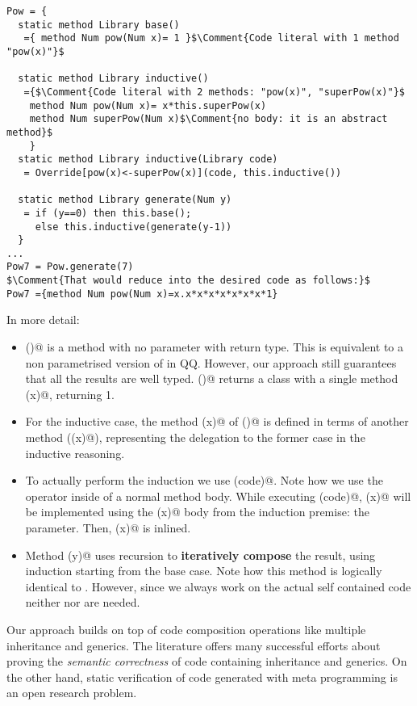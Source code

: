 \begin{lstlisting}
Pow = {
  static method Library base()
   ={ method Num pow(Num x)= 1 }$\Comment{Code literal with 1 method "pow(x)"}$

  static method Library inductive()
   ={$\Comment{Code literal with 2 methods: "pow(x)", "superPow(x)"}$
    method Num pow(Num x)= x*this.superPow(x)
    method Num superPow(Num x)$\Comment{no body: it is an abstract method}$
    }
  static method Library inductive(Library code)
   = Override[pow(x)<-superPow(x)](code, this.inductive())
  
  static method Library generate(Num y)
   = if (y==0) then this.base();
     else this.inductive(generate(y-1))
  }
...
Pow7 = Pow.generate(7)
$\Comment{That would reduce into the desired code as follows:}$
Pow7 ={method Num pow(Num x)=x.x*x*x*x*x*x*x*1}
\end{lstlisting}

\noindent In more detail:
\begin{itemize}
\item
\Q@base()@ is a method with no parameter with \Q@Library@ return type.
This is equivalent to a non parametrised version of \Q@Expr@ in QQ.
However, our approach still guarantees that all the results are well typed.
\Q@base()@ returns a class with a single method \Q@pow(x)@,
returning 1.
\item
For the inductive case, the method \Q@pow(x)@ of \Q@inductive()@ is defined in terms of
another method (\Q@superPow(x)@), representing the delegation to
the former case in the inductive reasoning.
\item To actually perform the induction we use \Q@inductive(code)@.
Note how we use the operator \Q@Override@ inside of a normal method body.
While executing \Q@inductive(code)@,
\Q@superPow(x)@ will be implemented using
the \Q@pow(x)@ body from the induction premise: the \Q@code@ parameter.
Then, \Q@superPow(x)@ is inlined.

\item Method \Q@generate(y)@ uses recursion to \textbf{iteratively compose} the result, using induction starting from
the base case.
Note how this method is logically identical to \Q@powerAux@. However,
since we always work on the actual self contained code neither \Q@lambdaX@ nor \Q@compile@ are needed.
\end{itemize}
Our approach builds on top of code composition operations like multiple inheritance and generics.
The literature offers \cite{barnett2004spec,burdy2005overview,muller2016viper} many successful efforts about proving the
\emph{semantic correctness} 
of code containing inheritance and generics.
On the other hand, static verification of code generated with meta programming is an open research problem.

